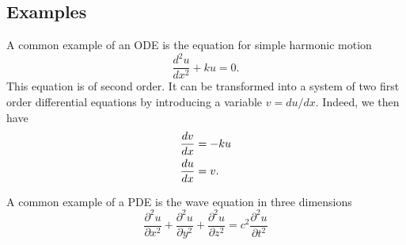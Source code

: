 \documentclass[12pt]{article}
\def\del{\partial}
\begin{document}
\subsection*{Examples}
A common example of an ODE is the equation for simple harmonic motion
\[ \frac{d^2u}{dx^2} + ku = 0. \]
This equation is of second order. It can be transformed into a system of two first order differential equations by introducing a variable $v=du/dx$. Indeed, we then have
\[
\aligned
\frac{dv}{dx} &= -ku \\
\frac{du}{dx} &= v.
\endaligned
\]

A common example of a PDE is the wave equation in three dimensions
\[ \frac{\del^2u}{\del x^2} + \frac{\del^2u}{\del y^2} +
 \frac{\del^2u}{\del z^2} = c^2 \frac{\del^2u}{\del t^2} \]
\end{document}
